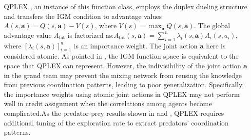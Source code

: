     
    QPLEX \cite{r8}, an instance of this function class, employs the duplex dueling structure and transfers the IGM condition to advantage values $A(s, \mathbf{a}) = Q(s, \mathbf{a}) - V(s)$, where $V(s) = \max_{\mathbf{a}} Q(s, \mathbf{a})$. The global advantage value $A_{\text{tot}}$ is factorized as:$A_{\text{tot}}(s, \mathbf{a}) = \sum_{i=1}^n \lambda_i(s, \mathbf{a}) A_i(s, a_i),$where $[\lambda_i(s, \mathbf{a})]_{i=1}^n$ is an importance weight. The joint action $\mathbf{a}$ here is considered atomic. As pointed in \cite{r8}, the IGM function space is equivalent to the space that QPLEX can represent. However, the indivisibility of the joint action $\mathbf{a}$ in the grand team may prevent the mixing network from reusing the knowledge from previous coordination patterns, leading to poor generalization. Specifically, the importance weights using atomic joint actions in QPLEX may not perform well in credit assignment when the correlations among agents become complicated.As the predator-prey results shown in \cite{r9} and \cite{r8}, QPLEX requires additional tuning of the exploration rate to extract predators’ coordination patterns.
    
        
